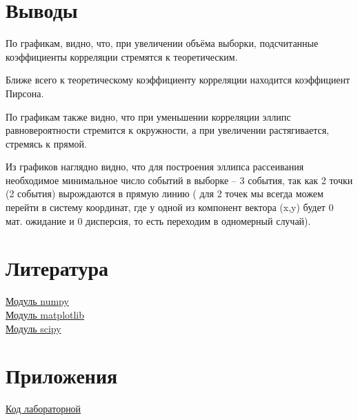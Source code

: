\documentclass[a4]{article}
\begin{document}
\section{Выводы}
По графикам, видно, что, при увеличении объёма выборки, подсчитанные коэффициенты корреляции стремятся к теоретическим.

Ближе всего к теоретическому коэффициенту корреляции находится коэффициент Пирсона.

По графикам также видно, что при уменьшении корреляции эллипс равновероятности стремится к окружности, а при увеличении растягивается, стремясь к прямой.

Из графиков наглядно видно, что для построения эллипса рассеивания необходимое минимальное число событий в выборке -- 3 события, так как 2 точки (2 события) вырождаются в прямую линию ( для 2 точек мы всегда можем перейти в систему координат, где у одной из компонент вектора (x,y) будет 0 мат. ожидание и 0 дисперсия, то есть переходим в одномерный случай).

\section{Литература}

\href{https://numpy.org/doc/stable/}{Модуль numpy}\\

\href{https://matplotlib.org/}{Модуль matplotlib}\\

\href{https://www.scipy.org/}{Модуль scipy}\\


\section{Приложения}

\href{https://github.com/Sergey-Sharapov/MatStat_labs/blob/main/lab5/lab5.py}{Код лабораторной}
\end{document}
